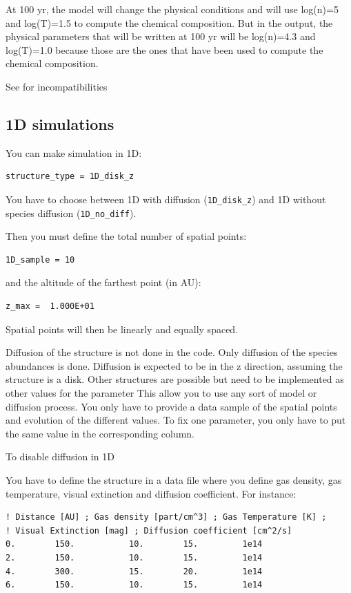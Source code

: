 \documentclass[english,a4paper,twoside]{article}
\begin{document}
At 100 yr, the model will change the physical conditions and will use log(n)=5 and log(T)=1.5 to compute the chemical composition. But in the output, the physical parameters that will be written at 100 yr will be log(n)=4.3 and log(T)=1.0 because those are the ones that have been used to compute the chemical composition. 

\begin{attention}
See  for incompatibilities
\end{attention}

\subsection{1D simulations}\label{sec:1D}
You can make simulation in 1D:
\begin{verbatim}
structure_type = 1D_disk_z
\end{verbatim}
You have to choose between 1D with diffusion (\verb|1D_disk_z|) and 1D without species diffusion (\verb|1D_no_diff|).


Then you must define the total number of spatial points:
\begin{verbatim}
1D_sample = 10
\end{verbatim}
and the altitude of the farthest point (in AU):
\begin{verbatim}
z_max =  1.000E+01
\end{verbatim}

Spatial points will then be linearly and equally spaced. 

Diffusion of the structure is not done in the code. Only diffusion of the species abundances is done. Diffusion is expected to 
be in the z direction, assuming the structure is a disk. Other structures are possible but need to be implemented as other 
values for the parameter  This allow you to use any sort of model or diffusion 
process. You only have to provide a data sample of the spatial points and evolution of the different values. To fix one 
parameter, you only have to put the same value in the corresponding column.

To disable diffusion in 1D

You have to define the structure in a data file  where you define gas density, gas temperature, visual extinction and diffusion coefficient. For instance:
\begin{verbatim}
! Distance [AU] ; Gas density [part/cm^3] ; Gas Temperature [K] ; 
! Visual Extinction [mag] ; Diffusion coefficient [cm^2/s]
0.        150.           10.        15.         1e14
2.        150.           10.        15.         1e14
4.        300.           15.        20.         1e14
6.        150.           10.        15.         1e14
\end{verbatim}
\end{document}
